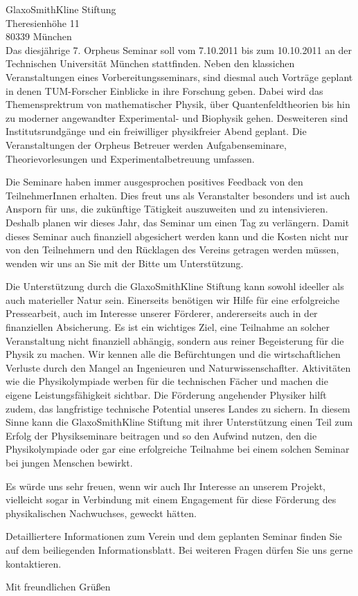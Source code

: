 \documentclass[../style/orpheus,fontsize=11pt]{scrlttr2}
\begin{document}
\begin{letter}{
\noindent GlaxoSmithKline Stiftung \\
Theresienh\"ohe 11 \\
80339 M\"unchen \\
}
Das diesj\"ahrige 7. Orpheus Seminar soll vom 7.10.2011 bis zum 10.10.2011 an der Technischen Universit\"at M\"unchen stattfinden. Neben den klassichen Veranstaltungen eines Vorbereitungsseminars, sind diesmal auch Vortr\"age geplant in denen TUM-Forscher Einblicke in ihre Forschung geben. Dabei wird das Themensprektrum von mathematischer Physik, \"uber Quantenfeldtheorien bis hin zu moderner angewandter Experimental- und Biophysik gehen.  Desweiteren sind Institutsrundg\"ange und ein freiwilliger physikfreier Abend geplant.  Die Veranstaltungen der Orpheus Betreuer werden Aufgabenseminare, Theorievorlesungen und Experimentalbetreuung umfassen.  

Die Seminare haben immer ausgesprochen positives Feedback von den TeilnehmerInnen erhalten.  Dies freut uns als Veranstalter besonders und ist auch Ansporn f\"ur uns, die zuk\"unftige T\"atigkeit auszuweiten und zu intensivieren.  Deshalb planen wir dieses Jahr, das Seminar um einen Tag zu verl\"angern.  Damit dieses Seminar auch finanziell abgesichert werden kann und die Kosten nicht nur von den Teilnehmern und den R\"ucklagen des Vereins getragen werden m\"ussen, wenden wir uns an Sie mit der Bitte um Unterst\"utzung.

Die Unterst\"utzung durch die GlaxoSmithKline Stiftung kann sowohl ideeller als auch materieller Natur sein.  Einerseits ben\"otigen wir Hilfe f\"ur eine erfolgreiche Pressearbeit, auch im Interesse unserer F\"orderer,  andererseits auch in der finanziellen Absicherung. Es ist ein wichtiges Ziel, eine Teilnahme an solcher Veranstaltung nicht finanziell abh\"angig, sondern aus reiner Begeisterung f\"ur die Physik zu machen. Wir kennen alle die Bef\"urchtungen und die wirtschaftlichen Verluste durch den Mangel an Ingenieuren und Naturwissenschaflter. Aktivit\"aten wie die Physikolympiade werben f\"ur die technischen F\"acher und machen die eigene Leistungsf\"ahigkeit sichtbar. Die F\"orderung angehender Physiker hilft zudem, das langfristige technische Potential unseres Landes zu sichern. In diesem Sinne kann die GlaxoSmithKline Stiftung mit ihrer Unterst\"utzung einen Teil zum Erfolg der Physikseminare beitragen und so den Aufwind nutzen, den die Physikolympiade oder gar eine erfolgreiche Teilnahme bei einem solchen Seminar bei jungen Menschen bewirkt.

Es w\"urde uns sehr freuen, wenn wir auch Ihr Interesse an unserem Projekt, vielleicht sogar in Verbindung mit einem Engagement f\"ur diese F\"orderung des physikalischen Nachwuchses, geweckt h\"atten.

Detailliertere Informationen zum Verein und dem geplanten Seminar finden Sie auf dem beiliegenden Informationsblatt.  Bei weiteren Fragen  d\"urfen Sie uns gerne kontaktieren.




\closing{Mit freundlichen Gr\"u\ss en}


\end{letter}
\end{document}
